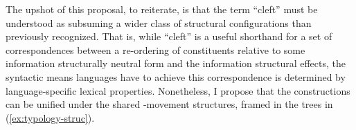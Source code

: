 \documentclass[12pt]{article}
\begin{document}

The upshot of this proposal, to reiterate, is that the term ``cleft'' must be understood as subsuming a wider class of structural configurations than previously recognized. That is, while ``cleft'' is a useful shorthand for a set of correspondences between a re-ordering of constituents relative to some information structurally neutral form and the information structural effects, the syntactic means languages have to achieve this correspondence is determined by language-specific lexical properties. Nonetheless, I propose that the constructions can be unified under the shared \abar{}-movement structures, framed in the trees in (\ref{ex:typology-struc}).
\end{document}
